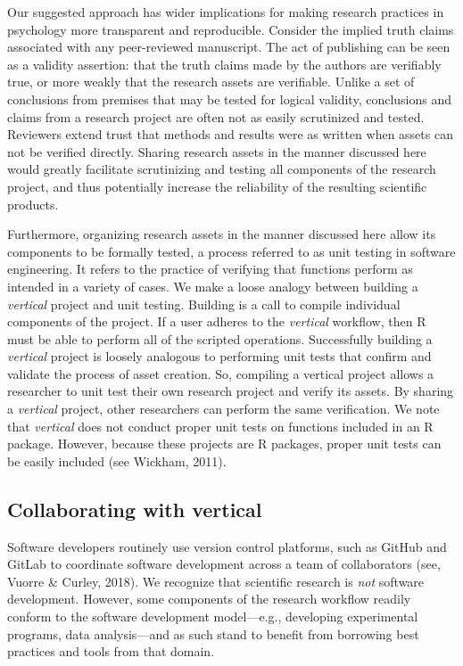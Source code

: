 \documentclass[
  english,
  jou,floatsintext]{apa6}
\begin{document}
Our suggested approach has wider implications for making research practices in psychology more transparent and reproducible. Consider the implied truth claims associated with any peer-reviewed manuscript. The act of publishing can be seen as a validity assertion: that the truth claims made by the authors are verifiably true, or more weakly that the research assets are verifiable. Unlike a set of conclusions from premises that may be tested for logical validity, conclusions and claims from a research project are often not as easily scrutinized and tested. Reviewers extend trust that methods and results were as written when assets can not be verified directly. Sharing research assets in the manner discussed here would greatly facilitate scrutinizing and testing all components of the research project, and thus potentially increase the reliability of the resulting scientific products.

Furthermore, organizing research assets in the manner discussed here allow its components to be formally tested, a process referred to as unit testing in software engineering. It refers to the practice of verifying that functions perform as intended in a variety of cases. We make a loose analogy between building a \emph{vertical} project and unit testing. Building is a call to compile individual components of the project. If a user adheres to the \emph{vertical} workflow, then R must be able to perform all of the scripted operations. Successfully building a \emph{vertical} project is loosely analogous to performing unit tests that confirm and validate the process of asset creation. So, compiling a vertical project allows a researcher to unit test their own research project and verify its assets. By sharing a \emph{vertical} project, other researchers can perform the same verification. We note that \emph{vertical} does not conduct proper unit tests on functions included in an R package. However, because these projects are R packages, proper unit tests can be easily included (see Wickham, 2011).

\hypertarget{collaborating-with-vertical}{%
\subsection{Collaborating with vertical}\label{collaborating-with-vertical}}

Software developers routinely use version control platforms, such as GitHub and GitLab to coordinate software development across a team of collaborators (see, Vuorre \& Curley, 2018). We recognize that scientific research is \emph{not} software development. However, some components of the research workflow readily conform to the software development model---e.g., developing experimental programs, data analysis---and as such stand to benefit from borrowing best practices and tools from that domain.
\end{document}

